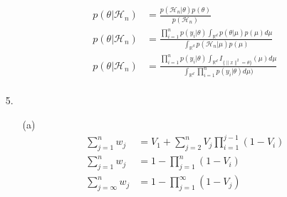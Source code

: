 \documentclass[11pt]{article}
\newcommand{\R}{\mathbb{R}}
\theoremstyle{definition}
\begin{document}
\begin{itemize}
\begin{itemize}
            \begin{align*}
                p(\theta\vert \mathcal{H}_n) &= \frac{p(\mathcal{H}_n \vert \theta)p(\theta)}{p(\mathcal{H}_n)} \\
                p(\theta\vert \mathcal{H}_n) &= \frac{\prod_{i=1}^n p(y_i \vert \theta)\int_{\R^d} p(\theta \vert \mu) p(\mu) d\mu}{\int_{\R^d}p(\mathcal{H}_n\vert \mu)p(\mu)} \\
                p(\theta\vert \mathcal{H}_n) &= \frac{\prod_{i=1}^n p(y_i \vert \theta)\int_{\R^d} I_{\{\|x\|^2=\theta\}}(\mu) d\mu}{\int_{\R^d}\prod_{i=1}^n p(y_i \vert \theta) d\mu)} \\
            \end{align*}
        \end{itemize}
    \item[5.]
        \begin{itemize}
            \item[(a)]
                \begin{align*}
                    \sum_{j=1}^n w_j &= V_1 + \sum_{j=2}^n V_j \prod_{i=1}^{j-1}(1-V_i) \\
                    \sum_{j=1}^n w_j &= 1 - \prod_{j=1}^{n}(1-V_i) \\
                    \sum_{j=\infty}^n w_j &= 1 - \prod_{j=1}^{\infty}(1-V_j) \\
                \end{align*}
                
        \end{itemize}

        

        
\end{itemize}
\end{document}
